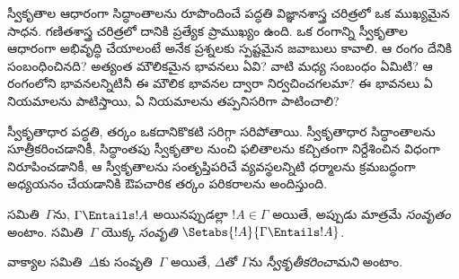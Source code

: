 \documentclass[../../../include/open-logic-section]{subfiles}
\begin{document}

\begin{explain}
స్వీకృతాల ఆధారంగా సిద్ధాంతాలను రూపొందించే పద్ధతి విజ్ఞానశాస్త్ర చరిత్రలో ఒక ముఖ్యమైన
సాధన. గణితశాస్త్ర చరిత్రలో దానికి ప్రత్యేక ప్రాముఖ్యం ఉంది. ఒక
రంగాన్ని స్వీకృతాల ఆధారంగా అభివృద్ధి చేయాలంటే అనేక ప్రశ్నలకు
స్పష్టమైన జవాబులు కావాలి. ఆ రంగం దేనికి సంబంధించినది? అత్యంత మౌలికమైన
భావనలు ఏవి? వాటి మధ్య సంబంధం ఏమిటి? ఆ రంగంలోని భావనలన్నిటినీ ఈ
మౌలిక భావనల ద్వారా నిర్వచించగలమా? ఈ భావనలు ఏ నియమాలను పాటిస్తాయి,
ఏ నియమాలను తప్పనిసరిగా పాటించాలి?

స్వీకృతాధార పద్ధతి, తర్కం ఒకదానికొకటి సరిగ్గా సరిపోతాయి. స్వీకృతాధార
సిద్ధాంతాలను సూత్రీకరించడానికీ, సిద్ధాంతపు స్వీకృతాల నుంచి ఫలితాలను
కచ్చితంగా నిర్దేశించిన విధంగా నిరూపించడానికీ, ఆ స్వీకృతాలను సంతృప్తిపరిచే
వ్యవస్థలన్నిటి ధర్మాలను క్రమబద్ధంగా అధ్యయనం చేయడానికి ఔపచారిక తర్కం
పరికరాలను అందిస్తుంది.
\end{explain}

\begin{defn}
 సమితి~$\Gamma$ను, $\Gamma \Entails !A$ అయినప్పుడల్లా
$!A \in \Gamma$ అయితే, అప్పుడు మాత్రమే \emph{సంవృతం} అంటాం.
 సమితి~$\Gamma$ యొక్క \emph{సంవృతి}
$\Setabs{!A}{\Gamma \Entails !A}$.

వాక్యాల సమితి~$\Delta$కు సంవృతి~$\Gamma$ అయితే, $\Delta$తో
$\Gamma$ను \emph{స్వీకృతీకరించామని} అంటాం.
\end{defn}
\end{document}
